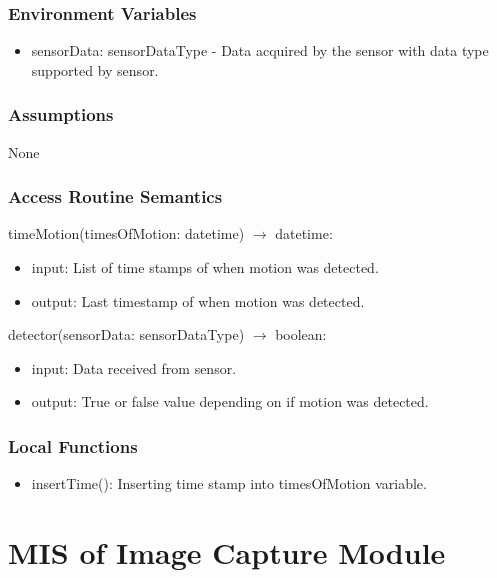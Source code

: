 \documentclass[12pt, titlepage]{article}
\begin{document}
\subsubsection{Environment Variables}
\begin{itemize}
  \item sensorData: sensorDataType - Data acquired by the sensor with data type supported by sensor.
\end{itemize}

\subsubsection{Assumptions}
None

\subsubsection{Access Routine Semantics}

\noindent timeMotion(timesOfMotion: datetime) $\rightarrow$ datetime:
\begin{itemize}
\item input: List of time stamps of when motion was detected. 
\item output: Last timestamp of when motion was detected. 
\end{itemize}

\noindent detector(sensorData: sensorDataType) $\rightarrow$ boolean:
\begin{itemize}
\item input: Data received from sensor. 
\item output: True or false value depending on if motion was detected. 
\end{itemize}

\subsubsection{Local Functions}

\begin{itemize}
  \item insertTime(): Inserting time stamp into timesOfMotion variable.
\end{itemize}


\newpage


\section{MIS of Image Capture Module} \label{Module} 
\end{document}
